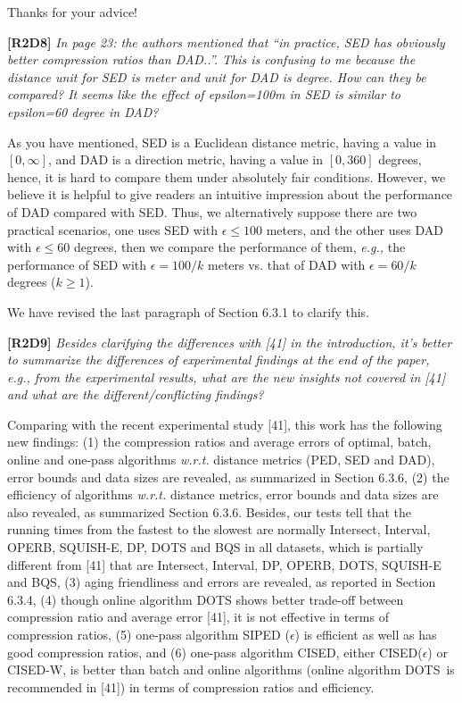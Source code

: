 \documentclass{letter}
\newcommand{\eg}{\emph{e.g.,}\xspace}
\newcommand{\wrt}{\emph{w.r.t.}\xspace}
\begin{document}
{Thanks for your advice!


\textbf{[R2D8]} \emph{In page 23: the authors mentioned that “in practice, SED has obviously better compression ratios than DAD..”. This is confusing to me because the distance unit for SED is meter and unit for DAD is degree. How can they be compared? It seems like the effect of epsilon=100m in SED is similar to epsilon=60 degree in DAD?}

As you have mentioned, SED is a Euclidean distance metric, having a value in $[0, \infty]$, and DAD is a direction metric, having a value in $[0, 360]$ degrees, hence, it is hard to compare them under absolutely fair conditions. However, we believe it is helpful to give readers an intuitive impression about the performance of DAD compared with SED. Thus, we alternatively suppose there are two practical scenarios, one uses SED with $\epsilon  \le  100$ meters, and the other uses DAD with $\epsilon \le 60$ degrees, then we compare the performance of them, \eg the performance of SED with $\epsilon=100/k$ meters vs. that of DAD with $\epsilon=60/k$ degrees ($k\ge 1$). 


{We have revised the last paragraph of Section 6.3.1 to clarify this. }

\textbf{[R2D9]} \emph{Besides clarifying the differences with [41] in the introduction, it’s better to summarize the differences of experimental findings at the end of the paper, e.g., from the experimental results, what are the new insights not covered in [41] and what are the different/conflicting findings?}

Comparing with the recent experimental study [41], this work has the following new findings: 
(1) the compression ratios and average errors of optimal, batch, online and one-pass algorithms \wrt distance metrics (PED, SED and DAD), error bounds and data sizes are revealed, as summarized in Section 6.3.6, 
(2) the efficiency of algorithms \wrt distance metrics, error bounds and data sizes are also revealed, as summarized Section 6.3.6. Besides, our tests tell that the running times from the fastest to the slowest are normally Intersect, Interval, OPERB, SQUISH-E, DP, DOTS and BQS in all datasets, which is partially different from [41] that are Intersect, Interval, DP, OPERB, DOTS, SQUISH-E and BQS, 
(3) aging friendliness and errors are revealed, as reported in Section 6.3.4,
(4) though online algorithm DOTS shows better trade-off between compression ratio and average error [41], it is not effective in terms of compression ratios,  
(5) one-pass algorithm SIPED ($\epsilon$) is efficient as well as has good compression ratios, and 
(6) one-pass algorithm CISED, either CISED($\epsilon$) or CISED-W, is better than batch and online algorithms (online algorithm DOTS~is recommended in [41]) in terms of compression ratios and efficiency.

}
\end{document}
